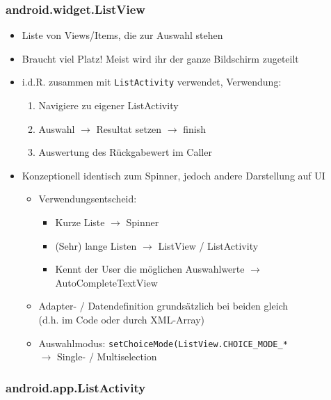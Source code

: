 \documentclass[a4paper]{article}
\begin{document}
\subsubsection{android.widget.ListView}

\begin{itemize}
	\item Liste von Views/Items, die zur Auswahl stehen
	\item Braucht viel Platz! Meist wird ihr der ganze Bildschirm zugeteilt
	\item i.d.R. zusammen mit \texttt{ListActivity} verwendet, Verwendung:
		\begin{enumerate}
			\item Navigiere zu eigener ListActivity
			\item Auswahl $\rightarrow$ Resultat setzen $\rightarrow$ finish
			\item Auswertung des Rückgabewert im Caller
		\end{enumerate}
	\item Konzeptionell identisch zum Spinner, jedoch andere Darstellung auf UI
		\begin{itemize}
			\item Verwendungsentscheid:
			\begin{itemize}
				\item Kurze Liste $\rightarrow$ Spinner
				\item (Sehr) lange Listen $\rightarrow$ ListView / ListActivity
				\item Kennt der User die möglichen Auswahlwerte $\rightarrow$ AutoCompleteTextView
			\end{itemize}
			\item Adapter- / Datendefinition grundsätzlich bei beiden gleich\\
			(d.h. im Code oder durch XML-Array)
			\item Auswahlmodus: \texttt{setChoiceMode(ListView.CHOICE\_MODE\_*} \\
			$\rightarrow$ Single- / Multiselection
		\end{itemize}
\end{itemize}

\subsubsection{android.app.ListActivity}
\end{document}
